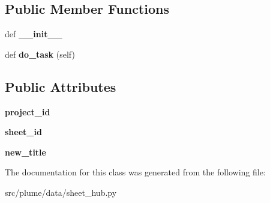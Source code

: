 \subsection*{Public Member Functions}
\begin{DoxyCompactItemize}
\item 
def {\bfseries \+\_\+\+\_\+init\+\_\+\+\_\+}\hypertarget{classplume-creator_1_1src_1_1plume_1_1data_1_1sheet__hub_1_1_set_title_a5886cbff60e2695f569cce1f6ef0f955}{}\label{classplume-creator_1_1src_1_1plume_1_1data_1_1sheet__hub_1_1_set_title_a5886cbff60e2695f569cce1f6ef0f955}

\item 
def {\bfseries do\+\_\+task} (self)\hypertarget{classplume-creator_1_1src_1_1plume_1_1data_1_1sheet__hub_1_1_set_title_aff41c8f34b8b9356c8a610132298fd43}{}\label{classplume-creator_1_1src_1_1plume_1_1data_1_1sheet__hub_1_1_set_title_aff41c8f34b8b9356c8a610132298fd43}

\end{DoxyCompactItemize}
\subsection*{Public Attributes}
\begin{DoxyCompactItemize}
\item 
{\bfseries project\+\_\+id}\hypertarget{classplume-creator_1_1src_1_1plume_1_1data_1_1sheet__hub_1_1_set_title_a9234e5c364c6b6aba8f9951c59b7ab0c}{}\label{classplume-creator_1_1src_1_1plume_1_1data_1_1sheet__hub_1_1_set_title_a9234e5c364c6b6aba8f9951c59b7ab0c}

\item 
{\bfseries sheet\+\_\+id}\hypertarget{classplume-creator_1_1src_1_1plume_1_1data_1_1sheet__hub_1_1_set_title_ad084b20af45c8c76919d9a03499c8b1c}{}\label{classplume-creator_1_1src_1_1plume_1_1data_1_1sheet__hub_1_1_set_title_ad084b20af45c8c76919d9a03499c8b1c}

\item 
{\bfseries new\+\_\+title}\hypertarget{classplume-creator_1_1src_1_1plume_1_1data_1_1sheet__hub_1_1_set_title_ad649176133012eff938bceabaedef74e}{}\label{classplume-creator_1_1src_1_1plume_1_1data_1_1sheet__hub_1_1_set_title_ad649176133012eff938bceabaedef74e}

\end{DoxyCompactItemize}


The documentation for this class was generated from the following file\+:\begin{DoxyCompactItemize}
\item 
src/plume/data/sheet\+\_\+hub.\+py\end{DoxyCompactItemize}
